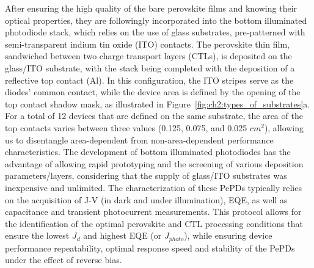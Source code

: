 After ensuring the high quality of the bare perovskite films and knowing their optical properties, they are followingly incorporated into the bottom illuminated photodiode stack, which relies on the use of glass substrates, pre-patterned with semi-transparent indium tin oxide (ITO) contacts. The perovskite thin film, sandwiched between two charge transport layers (CTLs), is deposited on the glass/ITO substrate, with the stack being completed with the deposition of a reflective top contact (Al). In this configuration, the ITO stripes serve as the diodes' common contact, while the device area is defined by the opening of the top contact shadow mask, as illustrated in Figure~\ref{fig:ch2:types_of_substrates}a. For a total of 12 devices that are defined on the same substrate, the area of the top contacts varies between three values (0.125, 0.075, and 0.025 $cm^2$), allowing us to disentangle area-dependent from non-area-dependent performance characteristics. The development of bottom illuminated photodiodes has the advantage of allowing rapid prototyping and the screening of various deposition parameters/layers, considering that the supply of glass/ITO substrates was inexpensive and unlimited. The characterization of these PePDs typically relies on the acquisition of J-V (in dark and under illumination), EQE, as well as capacitance and transient photocurrent measurements. This protocol allows for the identification of the optimal perovskite and CTL processing conditions that ensure the lowest $J_d$ and highest EQE (or $J_{photo}$), while ensuring device performance repeatability, optimal response speed and stability of the PePDs under the effect of reverse bias. 

